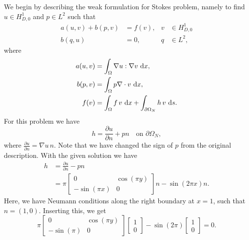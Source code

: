 \begin{solution}{6.6}
    We begin by describing the weak formulation for Stokes problem, namely to find $u \in H_{D,0}^{1}$ and $p \in L^{2}$ such that
    \begin{align*}
        a(u, v) + b(p, v) &= f(v), & v &\in H_{D,0}^{1} \\
        b(q, u) &= 0, & q &\in L^{2},
    \end{align*}
    where
    \begin{align*}
        a(u, v) &= \int_{\Omega} \nabla u : \nabla v \, \mathop{}\!\mathrm{d} x, \\
        b(p, v) &= \int_\Omega p \nabla \cdot v \, \mathop{}\!\mathrm{d} x, \\
        f(v) &= \int_{\Omega} f \, v \, \mathop{}\!\mathrm{d} x + \int_{\partial\Omega_N} h \, v \, \mathop{}\!\mathrm{d} s.
    \end{align*}
    For this problem we have
    \begin{equation*}
        h = \frac{\partial u}{\partial n} + p n \quad \text{on } \partial\Omega_N,
    \end{equation*}
    where $\frac{\partial u}{\partial n} = \nabla u \, n$.
    Note that we have changed the sign of $p$ from the original description.
    With the given solution we have
    \begin{align*}
        h &= \frac{\partial u}{\partial n} - p n \\
        &= \pi
        \begin{bmatrix}
            0 & \cos(\pi y) \\
            -\sin(\pi x) & 0
        \end{bmatrix} n - \sin(2 \pi x) n.
    \end{align*}
    Here, we have Neumann conditions along the right boundary at $x = 1$, such that $n = (1, 0)$.
    Inserting this, we get
    \begin{equation*}
        \pi
        \begin{bmatrix}
            0 & \cos(\pi y) \\
            -\sin(\pi) & 0
        \end{bmatrix}
        \begin{bmatrix}
            1 \\ 0
        \end{bmatrix} - \sin(2 \pi)
        \begin{bmatrix}
            1 \\ 0
        \end{bmatrix}
        = 0.
    \end{equation*}


\end{solution}
